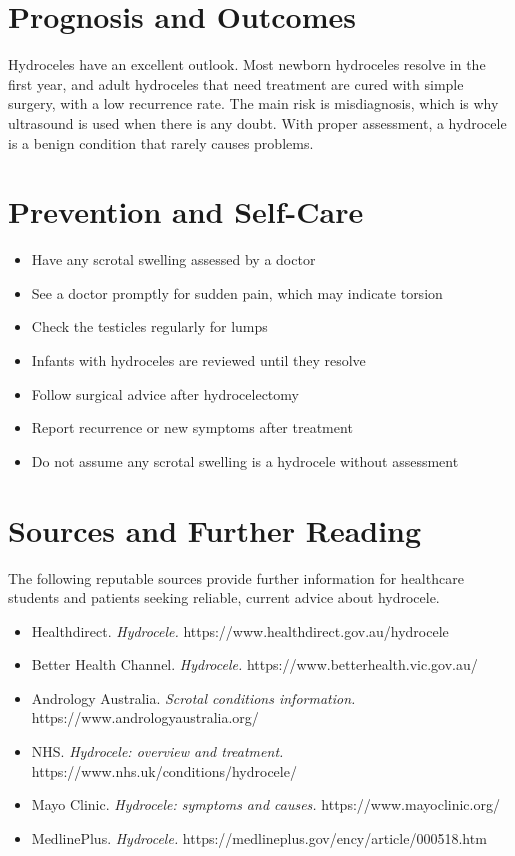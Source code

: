 \section*{Prognosis and Outcomes}
Hydroceles have an excellent outlook. Most newborn hydroceles resolve in the first year, and adult hydroceles that need treatment are cured with simple surgery, with a low recurrence rate. The main risk is misdiagnosis, which is why ultrasound is used when there is any doubt. With proper assessment, a hydrocele is a benign condition that rarely causes problems.

\section*{Prevention and Self-Care}
\begin{itemize}
    \item Have any scrotal swelling assessed by a doctor
    \item See a doctor promptly for sudden pain, which may indicate torsion
    \item Check the testicles regularly for lumps
    \item Infants with hydroceles are reviewed until they resolve
    \item Follow surgical advice after hydrocelectomy
    \item Report recurrence or new symptoms after treatment
    \item Do not assume any scrotal swelling is a hydrocele without assessment
\end{itemize}

\section*{Sources and Further Reading}
The following reputable sources provide further information for healthcare students and patients seeking reliable, current advice about hydrocele.

\begin{itemize}
    \item Healthdirect. \textit{Hydrocele.} https://www.healthdirect.gov.au/hydrocele
    \item Better Health Channel. \textit{Hydrocele.} https://www.betterhealth.vic.gov.au/
    \item Andrology Australia. \textit{Scrotal conditions information.} https://www.andrologyaustralia.org/
    \item NHS. \textit{Hydrocele: overview and treatment.} https://www.nhs.uk/conditions/hydrocele/
    \item Mayo Clinic. \textit{Hydrocele: symptoms and causes.} https://www.mayoclinic.org/
    \item MedlinePlus. \textit{Hydrocele.} https://medlineplus.gov/ency/article/000518.htm
\end{itemize}
